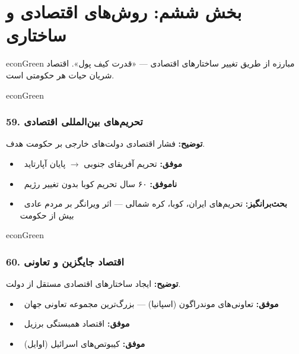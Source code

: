 \documentclass[a4paper,12pt]{article}
\newcommand{\success}[1]{\textcolor{greenPrimary}{\faCheckCircle\ \textbf{موفق:}} #1}
\newcommand{\failure}[1]{\textcolor{redPrimary}{\faTimesCircle\ \textbf{ناموفق:}} #1}
\newcommand{\debate}[1]{\textcolor{orangePrimary}{\faQuestionCircle\ \textbf{بحث‌برانگیز:}} #1}
\newcommand{\methodnum}[1]{\textcolor{purpleLight}{\textbf{#1.}}}
\begin{document}

\section{\textcolor{econGreen}{\faCoins} بخش ششم: روش‌های اقتصادی و ساختاری}

\begin{sectionbox}{econGreen}
مبارزه از طریق تغییر ساختارهای اقتصادی — «قدرت کیف پول». اقتصاد شریان حیات هر حکومتی است.
\end{sectionbox}

\begin{methodcard}{econGreen}
\subsubsection{\methodnum{59} تحریم‌های بین‌المللی اقتصادی}
\textbf{توضیح:} فشار اقتصادی دولت‌های خارجی بر حکومت هدف.

\begin{itemize}[label=\textcolor{greenPrimary}{\faCheckCircle}]
  \item \success{تحریم آفریقای جنوبی $\rightarrow$ پایان آپارتاید}
\end{itemize}
\begin{itemize}[label=\textcolor{redPrimary}{\faTimesCircle}]
  \item \failure{۶۰ سال تحریم کوبا بدون تغییر رژیم}
\end{itemize}
\begin{itemize}[label=\textcolor{yellowPrimary}{\faExclamationTriangle}]
  \item \debate{تحریم‌های ایران، کوبا، کره شمالی — اثر ویرانگر بر مردم عادی بیش از حکومت}
\end{itemize}
\end{methodcard}

\begin{methodcard}{econGreen}
\subsubsection{\methodnum{60} اقتصاد جایگزین و تعاونی}
\textbf{توضیح:} ایجاد ساختارهای اقتصادی مستقل از دولت.

\begin{itemize}[label=\textcolor{greenPrimary}{\faCheckCircle}]
  \item \success{تعاونی‌های موندراگون (اسپانیا) — بزرگ‌ترین مجموعه تعاونی جهان}
  \item \success{اقتصاد همبستگی برزیل}
  \item \success{کیبوتص‌های اسرائیل (اوایل)}
\end{itemize}
\end{methodcard}
\end{document}
